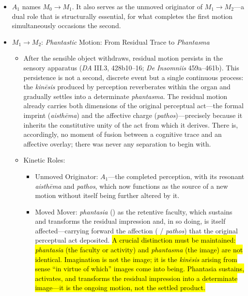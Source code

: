 \begin{itemize}
\begin{itemize}
        \item $A_1$ names $M_0 \rightarrow M_1$. It also serves as the unmoved originator of $M_1 \rightarrow M_2$---a dual role that is structurally essential, for what completes the first motion simultaneously occasions the second.
        \item $M_1 \rightarrow M_2$: \textit{Phantastic} Motion: From Residual Trace to \textit{Phantasma}
        \begin{itemize}
            \item After the sensible object withdraws, residual motion persists in the sensory apparatus (\textit{DA} III.3, 428b10--16; \textit{De Insomniis} 459a--461b). This persistence is not a second, discrete event but a single continuous process: the \textit{kinēsis} produced by perception reverberates within the organ and gradually settles into a determinate \textit{phantasma}. The residual motion already carries both dimensions of the original perceptual act---the formal imprint (\textit{aisthēma}) and the affective charge (\textit{pathos})---precisely because it inherits the constitutive unity of the act from which it derives. There is, accordingly, no moment of fusion between a cognitive trace and an affective overlay; there was never any separation to begin with.
            \item Kinetic Roles:
            \begin{itemize}
                \item Unmoved Originator: $A_1$---the completed perception, with its resonant \textit{aisthēma} and \textit{pathos}, which now functions as the source of a new motion without itself being further altered by it.
                \item Moved Mover: \textit{phantasia} () as the retentive faculty, which sustains and transforms the residual impression and, in so doing, is itself affected---carrying forward the affection ( / \textit{pathos}) that the original perceptual act deposited. \hl{A crucial distinction must be maintained: \textit{phantasia} (the faculty or activity) and \textit{phantasma} (the image) are not identical. Imagination is not the image; it is the \textit{kinēsis} arising from sense ``in virtue of which'' images come into being. Phantasia sustains, activates, and transforms the residual impression into a determinate image---it is the ongoing motion, not the settled product.}

\end{itemize}
\end{itemize}
\end{itemize}
\end{itemize}
